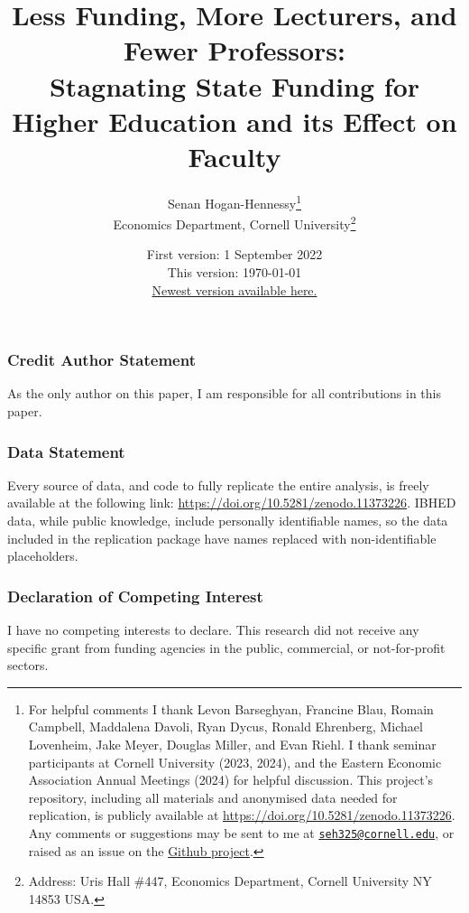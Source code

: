 \documentclass[notitlepage,12pt]{article}
\author{Senan Hogan-Hennessy\thanks{
        For helpful comments I thank
        Levon Barseghyan,
        Francine Blau,
        Romain Campbell,
        Maddalena Davoli,
        Ryan Dycus,
        Ronald Ehrenberg,
        Michael Lovenheim,
        Jake Meyer,
        Douglas Miller,
        and Evan Riehl.
        I thank seminar participants at Cornell University (2023, 2024), and the Eastern Economic Association Annual Meetings (2024) for helpful discussion.
        This project's repository, including all materials and anonymised data needed for replication, is publicly available at 
        \url{https://doi.org/10.5281/zenodo.11373226}.
        Any comments or suggestions may be sent to me at \href{mailto:seh325@cornell.edu}{\nolinkurl{seh325@cornell.edu}}, or raised as an issue on the \href{https://github.com/shoganhennessy/state-funding-faculty/}{Github project}.
    } \\
    \vspace{0.1cm}
    Economics Department, Cornell University\footnote{
        Address: Uris Hall \#447, Economics Department, Cornell University NY 14853 USA.
    }
}
\title{Less Funding, More Lecturers, and Fewer Professors: \\ \vspace{0.1cm}
    Stagnating State Funding for Higher Education and its Effect on Faculty}
\date{First version: 1 September 2022 \\ \vspace{0.15cm}
    This version: \today \\ \vspace{0.15cm}
    \href{https://github.com/shoganhennessy/state-funding-faculty/blob/main/state-funding-faculty-2024.pdf}{Newest version available here.}
    \\ \vspace{-0.5cm}
}
\begin{document}
\maketitle
\thispagestyle{empty}
\begin{abstract}
    \noindent
    
\end{abstract}

\newpage
\setcounter{page}{1}
\doublespacing
\noindent






\subsubsection*{Credit Author Statement}
As the only author on this paper, I am responsible for all contributions in this paper.
\subsubsection*{Data Statement}
Every source of data, and code to fully replicate the entire analysis, is freely available at the following link:
\url{https://doi.org/10.5281/zenodo.11373226}.
IBHED data, while public knowledge, include personally identifiable names, so the data included in the replication package have names replaced with non-identifiable placeholders.
\subsubsection*{Declaration of Competing Interest}
I have no competing interests to declare.
This research did not receive any specific grant from funding agencies in the public, commercial, or not-for-profit sectors.

\singlespacing



\end{document}
